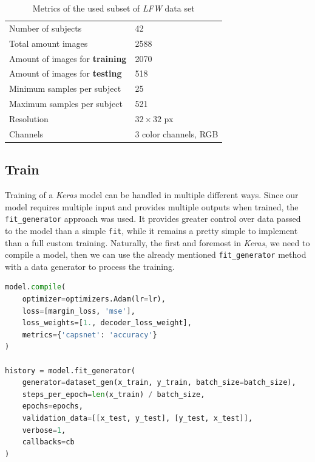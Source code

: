 \begin{table}[ht]
    \centering
    \begin{tabularx}{.8\textwidth}{l|X}
        \toprule
        Number of subjects & \num{42} \\
        Total amount images & \num{2588} \\
        Amount of images for \textbf{training} & \num{2070} \\
        Amount of images for \textbf{testing} & \num{518} \\
        Minimum samples per subject & \num{25} \\
        Maximum samples per subject & \num{521} \\
        Resolution & $32\times32$ px \\
        Channels & 3 color channels, RGB \\
        \bottomrule
    \end{tabularx}
    \caption{Metrics of the used subset of \textit{LFW} data set}
\end{table}

\subsection{Train}

Training of a \textit{Keras} model can be handled in multiple different ways. Since our model requires multiple input and provides multiple outputs when trained, the \texttt{fit\_generator} approach was used. It provides greater control over data passed to the model than a simple \texttt{fit}, while it remains a pretty simple to implement than a full custom training. Naturally, the first and foremost in \textit{Keras}, we need to compile a model, then we can use the already mentioned \texttt{fit\_generator} method with a data generator to process the training.

\begin{lstlisting}[language=Python, caption=Training a \textit{Keras} mode using \texttt{fit\_generator}]
model.compile(
    optimizer=optimizers.Adam(lr=lr),
    loss=[margin_loss, 'mse'],
    loss_weights=[1., decoder_loss_weight],
    metrics={'capsnet': 'accuracy'}
)

history = model.fit_generator(
    generator=dataset_gen(x_train, y_train, batch_size=batch_size),
    steps_per_epoch=len(x_train) / batch_size,
    epochs=epochs,
    validation_data=[[x_test, y_test], [y_test, x_test]],
    verbose=1,
    callbacks=cb
)
\end{lstlisting}

